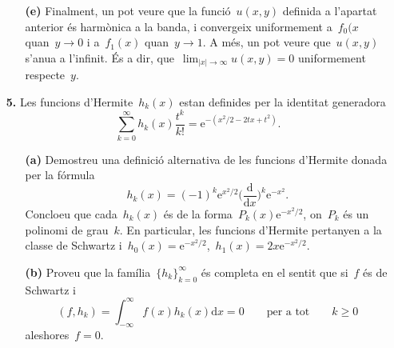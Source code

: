 \documentclass[a4paper]{article}
\theoremstyle{plain}
\theoremstyle{definition}
\newcommand{\e}{\mathrm{e}}
\newcommand{\diff}{\mathrm{d}}
\newcommand{\abs}[1]{\lvert{#1}\rvert}
\begin{document}
\begin{enumerate}
    \item[]\begin{enumerate}
        \item[\textbf{(e)}] Finalment, un pot veure que la funció~\(u(x,y)\)
            definida a l'apartat anterior és harmònica a la banda, i convergeix
            uniformement a~\(f_{0}(x\) quan~\(y\to0\) i a~\(f_{1}(x)\)
            quan~\(y\to1\).
            A més, un pot veure que~\(u(x,y)\) s'anu{\lgem}a a l'infinit. És a
            dir, que~\(\lim_{\abs{x}\to\infty}u(x,y)=0\) uniformement
            respecte~\(y\).
    \end{enumerate}
\end{enumerate}

\begin{enumerate}
    \item[\textbf{5.}] Les funcions d'Hermite~\(h_{k}(x)\) estan definides per
        la identitat generadora
        \[
            \sum_{k=0}^{\infty}
            h_{k}(x) \frac{t^{k}}{k!}
            =
            \e^{-(x^{2}/2 - 2tx+t^{2})}.
        \]
        \begin{enumerate}
            \item[\textbf{(a)}] Demostreu una definició alternativa de les
                funcions d'Hermite donada per la fórmula
                \[
                    h_{k}(x)
                    =
                    (-1)^{k} \e^{x^{2}/2}
                    \biggl(\frac{\diff}{\diff x}\biggr)^{k}
                    \e^{-x^{2}}.
                \]
                Concloeu que cada~\(h_{k}(x)\) és de la
                forma~\(P_{k}(x)\e^{-x^{2}/2}\), on~\(P_{k}\) és un polinomi de
                grau~\(k\).
                En particular, les funcions d'Hermite pertanyen a la classe de
                Schwartz i~\(h_{0}(x) =
                \e^{-x^{2}/2}\),~\(h_{1}(x)=2x\e^{-x^{2}/2}\).
        \end{enumerate}
\end{enumerate}

\begin{enumerate}
    \item[]\begin{enumerate}
        \item[\textbf{(b)}] Proveu que la família~\(\{h_{k}\}_{k=0}^{\infty}\)
            és completa en el sentit que si~\(f\) és de Schwartz i
            \[
                (f,h_{k}) = \int_{-\infty}^{\infty}f(x)h_{k}(x)\diff x = 0
                \qquad\text{per a tot}\qquad
                k\geq0
            \]
            aleshores~\(f=0\).
    \end{enumerate}
\end{enumerate}
\end{document}
